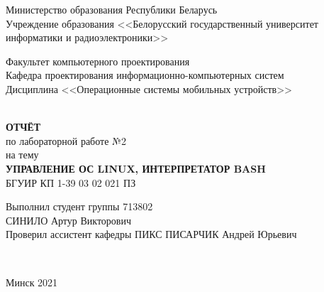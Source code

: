 
\begin{titlepage}
  \begin{center}
    Министерство образования Республики Беларусь\\
    Учреждение образования <<Белорусский государственный университет информатики и радиоэлектроники>>\\[2em]

    \begin{minipage}{\textwidth}
      \begin{flushleft}
		  Факультет компьютерного проектирования\\[1em]

		  Кафедра проектирования информационно-компьютерных систем\\[1em]

          Дисциплина <<Операционные системы мобильных устройств>>
      \end{flushleft}
    \end{minipage}\\[5em]

	\textbf{\MakeTextUppercase{Отчёт}}\\
    {по лабораторной работе №2}\\
	{на тему}\\[1em]
	\textbf{\MakeTextUppercase{УПРАВЛЕНИЕ ОС LINUX, ИНТЕРПРЕТАТОР BASH}}\\[1em]

	{БГУИР КП 1-39 03 02 021 ПЗ}\\[5em]

    \begin{flushright}
      \begin{minipage}{0.5\textwidth}
        \begin{flushleft}
          Выполнил студент группы 713802\\
		  \MakeTextUppercase{Синило} Артур Викторович\\[2em]

          Проверил ассистент кафедры ПИКС
		  \MakeTextUppercase{Писарчик} Андрей Юрьевич
        \end{flushleft}
      \end{minipage}\\[2.2em]
    \end{flushright}

        \vfill
    {\normalsize Минск 2021}
  \end{center}
\end{titlepage}

